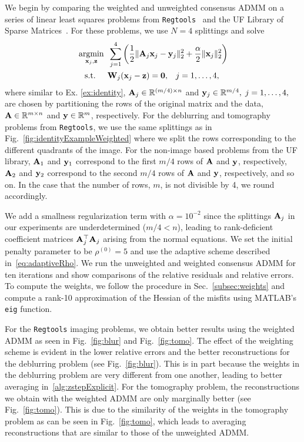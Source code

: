 \documentclass[11pt]{article}          %
\DeclareMathOperator*{\argmin}{argmin}
\newcommand{\hf}{\frac12}
\newcommand{\bbR}{\mathbb{R}}
\newcommand{\bfA}{{\bf A}}
\newcommand{\bfW}{{\bf W}}
\newcommand{\bfy}{{\bf  y}}
\newcommand{\bfx}{{\bf  x}}
\newcommand{\bfz}{{\bf z}}
\begin{document}
We begin by comparing the weighted and unweighted consensus ADMM on a series of linear least squares problems from \texttt{Regtools}~\cite{hansen1994regularization} and the UF Library of Sparse Matrices~\cite{davis2011university}. For these problems, we use $N=4$ splittings and solve
\begin{equation}
  \begin{split}
    &\argmin_{\bfx_j, \bfz} \;\; \sum_{j=1}^4 \left( \hf \| \bfA_j \bfx_j - \bfy_j \|_2^2 + \frac{\alpha}{2} \| \bfx_j \|_2^2 \right)
    \\
    &\;\;\text{  s.t. } \quad \bfW_j(\bfx_j - \bfz) = \mathbf{0}, \;\;\; j=1,\ldots,4,
  \end{split}
\end{equation}
where similar to Ex. \ref{ex:identity}, $\bfA_j \in \bbR^{(m/4) \times n}$ and $\bfy_j \in \bbR^{m/4}, \; j=1,\ldots,4,$ are chosen by partitioning the rows of the original matrix and the data, $\bfA \in \bbR^{m \times n}$ and $\bfy \in \bbR^m$, respectively. For the deblurring and tomography problems from \texttt{Regtools}, we use the same splittings as in Fig.~\ref{fig:identityExampleWeighted} where we split the rows corresponding to the different quadrants of the image. For the non-image based problems from the UF library, $\bfA_1$ and $\bfy_1$ correspond to the first $m/4$ rows of $\bfA$ and $\bfy$, respectively, $\bfA_2$ and $\bfy_2$ correspond to the second $m/4$ rows of $\bfA$ and $\bfy$, respectively, and so on. In the case that the number of rows, $m$, is not divisible by 4, we round accordingly. 


We add a smallness regularization term with $\alpha=10^{-2}$ since the splittings $\bfA_j$ in our experiments are underdetermined ($m/4 < n$), leading to rank-deficient coefficient matrices $\bfA_j^\top \bfA_j$ arising from the normal equations. We set the initial penalty parameter to be $\rho^{(0)} = 5$ and use the adaptive scheme described in~\eqref{eq:adaptiveRho}. We run the unweighted and weighted consensus ADMM for ten iterations and show comparisons of the relative residuals and relative errors. To compute the weights, we follow the procedure in Sec.~\ref{subsec:weights} and compute a rank-10 approximation of the Hessian of the misfits using MATLAB's \texttt{eig} function.

For the \texttt{Regtools} imaging problems, we obtain better results using the weighted ADMM as seen in Fig.~\ref{fig:blur} and Fig.~\ref{fig:tomo}. The effect of the weighting scheme is evident in the lower relative errors and the better reconstructions for the deblurring problem (see Fig.~\ref{fig:blur}). This is in part because the weights in the deblurring problem are very different from one another, leading to better averaging in~\eqref{alg:zstepExplicit}. For the tomography problem, the reconstructions we obtain with the weighted ADMM are only marginally better (see Fig.~\ref{fig:tomo}). This is due to the similarity of the weights in the tomography problem as can be seen in Fig.~\ref{fig:tomo}, which leads to averaging reconstructions that are similar to those of the unweighted ADMM. 
\end{document}
